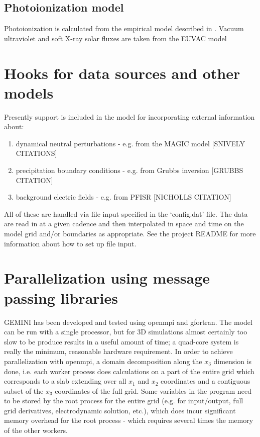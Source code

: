 \documentclass[11pt,letterpaper]{article}
\begin{document}
\subsection{Photoionization model}

Photoionization is calculated from the empirical model described in \citet{Solomon:2005}.  Vacuum ultraviolet and soft X-ray solar fluxes are taken from the EUVAC model \citep{Richards:1994}


\section{Hooks for data sources and other models}

Presently support is included in the model for incorporating external information about:
\begin{enumerate}
  \item dynamical neutral perturbations - e.g. from the MAGIC model [SNIVELY CITATIONS]
  \item precipitation boundary conditions - e.g. from Grubbs inversion [GRUBBS CITATION]
  \item background electric fields - e.g. from PFISR [NICHOLLS CITATION]
\end{enumerate}
All of these are handled via file input specified in the `config.dat' file.  The data are read in at a given cadence and then interpolated in space and time on the model grid and/or boundaries as appropriate.  See the project README for more information about how to set up file input.

\section{Parallelization using message passing libraries}

GEMINI has been developed and tested using openmpi and gfortran.  The model can be run with a single processor, but for 3D simulations almost certainly too slow to be produce results in a useful amount of time; a quad-core system is really the minimum, reasonable hardware requirement.  In order to achieve parallelization with openmpi, a domain decomposition along the $x_3$ dimension is done, i.e. each worker process does calculations on a part of the entire grid which corresponds to a slab extending over all $x_1$ and $x_2$ coordinates and a contiguous subset of the $x_3$ coordinates of the full grid.  Some variables in the program need to be stored by the root process for the entire grid (e.g. for input/output, full grid derivatives, electrodynamic solution, etc.), which does incur significant memory overhead for the root process - which requires several times the memory of the other workers.  
\end{document}

